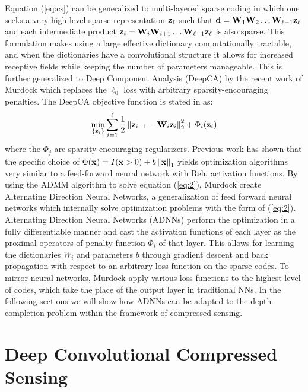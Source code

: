 Equation (\ref{eq:cs}) can be generalized to multi-layered sparse coding in which one seeks a very high level sparse representation $\mathbf{z}_{\ell}$ such that $\mathbf{d} = \mathbf{W}_1\mathbf{W}_2\ldots \mathbf{W}_{\ell-1}\mathbf{z}_{\ell}$ and each intermediate product $\mathbf{z}_i = \mathbf{W}_i\mathbf{W}_{i+1}\ldots \mathbf{W}_{\ell-1}\mathbf{z}_{\ell}$ is also sparse. This formulation makes using a large effective dictionary computationally tractable, and when the dictionaries have a convolutional structure it allows for increased receptive fields while keeping the number of parameters manageable. This is further generalized to Deep Component Analysis (DeepCA) by the recent work of Murdock \etal which replaces the $\ell_0$ loss with arbitrary sparsity-encouraging penalties. The DeepCA objective function is stated in \cite{murdock} as:
\begin{equation}
  \label{eq:2}
  \min_{\{\mathbf{z}_i\}} \sum_{i=1}^{\ell} \frac{1}{2} \left\Vert \mathbf{z}_{i-1} - \mathbf{W}_i\mathbf{z}_i\right\Vert_2^2 + \Phi_i(\mathbf{z}_i)
\end{equation}
where the $\Phi_j$ are sparsity encouraging regularizers. Previous work has shown that the specific choice of $\Phi(\mathbf{x}) = I(\mathbf{x} > 0) + b\left\Vert\mathbf{x}\right\Vert_1$ yields optimization algorithms very similar to a feed-forward neural network with Relu activation functions. By using the ADMM algorithm to solve equation (\ref{eq:2}), Murdock \etal create Alternating Direction Neural Networks, a generalization of feed forward neural networks which internally solve optimization problems with the form of (\ref{eq:2}). Alternating Direction Neural Networks (ADNNs) perform the optimization in a fully differentiable manner and cast the activation functions of each layer as the proximal operators of penalty function $\Phi_i$ of that layer. This allows for learning the dictionaries $W_i$ and parameters $b$ through gradient descent and back propagation with respect to an arbitrary loss function on the sparse codes. To mirror neural networks, Murdock \etal  apply various loss functions to the highest level of codes, which take the place of the output layer in traditional NNs. In the following sections we will show how ADNNs can be adapted to the depth completion problem within the framework of compressed sensing.\\

\section{Deep Convolutional Compressed Sensing}
\label{sec:dccs}


